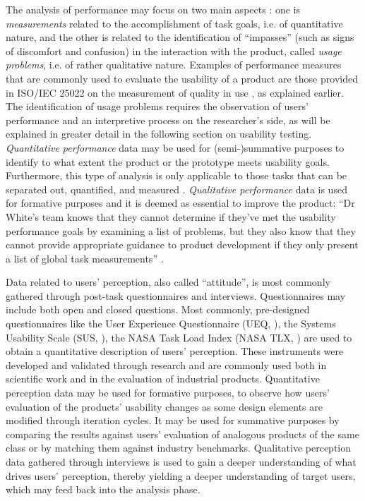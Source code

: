 The analysis of performance may focus on two main aspects \citep[1]{lewis2012}: one is \textit{measurements} related to the accomplishment of task goals, i.e. of quantitative nature, and the other is related to the identification of “impasses” (such as signs of discomfort and confusion) in the interaction with the product, called \textit{usage problems}, i.e. of rather qualitative nature. Examples of performance measures that are commonly used to evaluate the usability of a product are those provided in ISO/IEC 25022 on the measurement of quality in use \citep{iso2016}, as explained earlier. The identification of usage problems requires the observation of users’ performance and an interpretive process on the researcher’s side, as will be explained in greater detail in the following section on usability testing. \textit{Quantitative performance} data may be used for (semi-)summative purposes to identify to what extent the product or the prototype meets usability goals. Furthermore, this type of analysis is only applicable to those tasks that can be separated out, quantified, and measured \citep[8]{lazar2017research}. \textit{Qualitative performance} data is used for formative purposes and it is deemed as essential to improve the product: ``Dr White’s team knows that they cannot determine if they’ve met the usability performance goals by examining a list of problems, but they also know that they cannot provide appropriate guidance to product development if they only present a list of global task measurements'' \citep[3]{lewis2012}.

Data related to users’ perception, also called “attitude”, is most commonly gathered through post-task questionnaires and interviews. Questionnaires may include both open and closed questions. Most commonly, pre-designed questionnaires like the User Experience Questionnaire (UEQ, \citealt{laugwitz2008construction}), the Systems Usability Scale (SUS, \citealt{brooke1996sus}), the NASA Task Load Index (NASA TLX, \citealt{hart1988development}) are used to obtain a quantitative description of users’ perception. These instruments were developed and validated through research and are commonly used both in scientific work and in the evaluation of industrial products. Quantitative perception data may be used for formative purposes, to observe how users’ evaluation of the products’ usability changes as some design elements are modified through iteration cycles. It may be used for summative purposes by comparing the results against users’ evaluation of analogous products of the same class or by matching them against industry benchmarks. Qualitative perception data gathered through interviews is used to gain a deeper understanding of what drives users’ perception, thereby yielding a deeper understanding of target users, which may feed back into the analysis phase.



